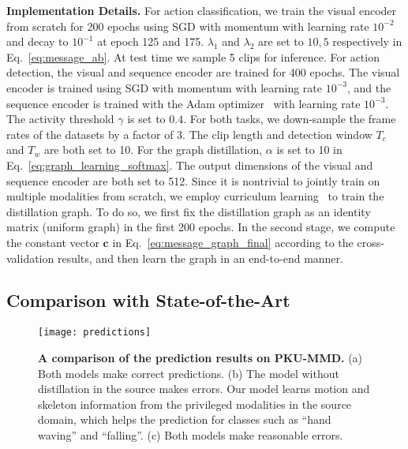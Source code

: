 \noindent\textbf{Implementation Details.} 
For action classification, we train the visual encoder from scratch for 200 epochs using SGD with momentum with learning rate $10^{-2}$ and decay to $10^{-1}$ at epoch 125 and 175. $\lambda_1$ and $\lambda_2$ are set to $10,5$ respectively in Eq.~\eqref{eq:message_ab}. At test time we sample 5 clips for inference. For action detection, the visual and sequence encoder are trained for 400 epochs. The visual encoder is trained using SGD with momentum with learning rate $10^{-3}$, and the sequence encoder is trained with the Adam optimizer~\cite{kingma2015adam} with learning rate $10^{-3}$. The activity threshold $\gamma$ is set to $0.4$. For both tasks, we down-sample the frame rates of the datasets by a factor of 3. The clip length and detection window $T_c$ and $T_w$ are both set to 10. For the graph distillation, $\alpha$ is set to 10 in Eq.~\eqref{eq:graph_learning_softmax}. The output dimensions of the visual and sequence encoder are both set to 512. Since it is nontrivial to jointly train on multiple modalities from scratch, we employ curriculum learning~\cite{bengio2009curriculum} to train the distillation graph. To do so, we first fix the distillation graph as an identity matrix (uniform graph) in the first 200 epochs. In the second stage, we compute the constant vector $\mathbf{c}$ in Eq.~\eqref{eq:message_graph_final} according to the cross-validation results, and then learn the graph in an end-to-end manner.



\subsection{Comparison with State-of-the-Art}\label{sec:exp_soa}



\begin{figure}[t]
\begin{center}
\texttt{[image: predictions]}
\end{center}
\caption{\textbf{A comparison of the prediction results on PKU-MMD.} (a) Both models make correct predictions. (b) The model without distillation in the source makes errors. Our model learns motion and skeleton information from the privileged modalities in the source domain, which helps the prediction for classes such as ``hand waving'' and ``falling''. (c) Both models make reasonable errors.}
\label{fig:detection}
\end{figure}





